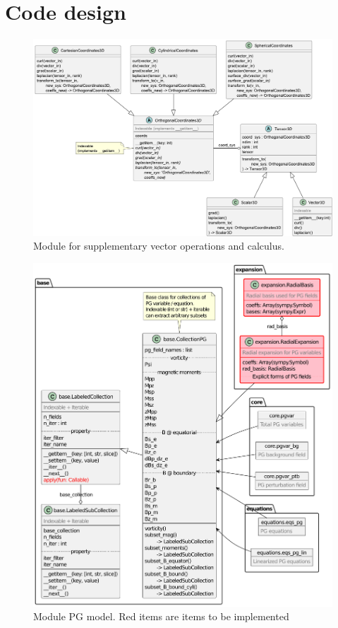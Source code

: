 \section{Code design}

\begin{figure}[ht]
    \centering
    \includegraphics[width=\linewidth]{./img/classes_vector_calculus.pdf}
    \caption{Module for supplementary vector operations and calculus.}
\end{figure}


\begin{figure}[ht]
    \centering
    \includegraphics[width=\linewidth]{./img/classes_pg_model.pdf}
    \caption{Module PG model. Red items are items to be implemented}
\end{figure}
